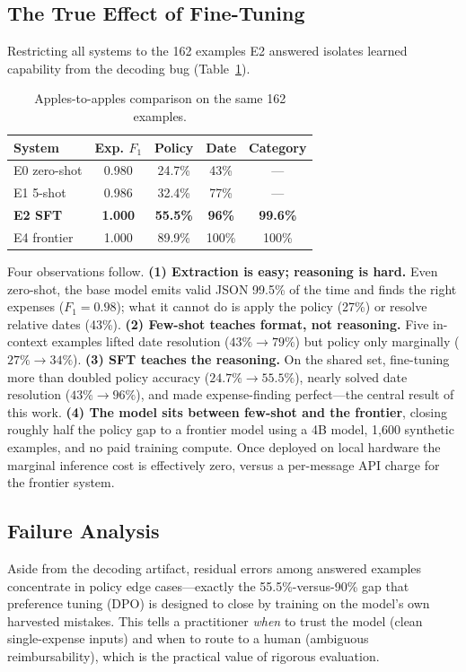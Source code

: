 \documentclass[conference]{IEEEtran}
\begin{document}
\subsection{The True Effect of Fine-Tuning}
Restricting all systems to the 162 examples E2 answered isolates learned
capability from the decoding bug (Table~\ref{tab:cond}).

\begin{table}[t]
\caption{Apples-to-apples comparison on the same 162 examples.}
\label{tab:cond}
\centering
\small
\begin{tabular}{lcccc}
\toprule
System & Exp. $F_1$ & Policy & Date & Category \\
\midrule
E0 zero-shot & 0.980 & 24.7\% & 43\% & --- \\
E1 5-shot    & 0.986 & 32.4\% & 77\% & --- \\
\textbf{E2 SFT} & \textbf{1.000} & \textbf{55.5\%} & \textbf{96\%} & \textbf{99.6\%} \\
E4 frontier  & 1.000 & 89.9\% & 100\% & 100\% \\
\bottomrule
\end{tabular}
\end{table}

Four observations follow. \textbf{(1) Extraction is easy; reasoning is hard.}
Even zero-shot, the base model emits valid JSON 99.5\% of the time and finds the
right expenses ($F_1=0.98$); what it cannot do is apply the policy (27\%) or
resolve relative dates (43\%). \textbf{(2) Few-shot teaches format, not
reasoning.} Five in-context examples lifted date resolution ($43\%\!\to\!79\%$)
but policy only marginally ($27\%\!\to\!34\%$). \textbf{(3) SFT teaches the
reasoning.} On the shared set, fine-tuning more than doubled policy accuracy
($24.7\%\!\to\!55.5\%$), nearly solved date resolution ($43\%\!\to\!96\%$), and
made expense-finding perfect---the central result of this work. \textbf{(4) The
model sits between few-shot and the frontier}, closing roughly half the policy
gap to a frontier model using a 4B model, 1{,}600 synthetic examples, and no
paid training compute. Once deployed on local hardware the marginal inference
cost is effectively zero, versus a per-message API charge for the frontier
system.

\subsection{Failure Analysis}
Aside from the decoding artifact, residual errors among answered examples
concentrate in policy edge cases---exactly the 55.5\%-versus-90\% gap that
preference tuning (DPO) is designed to close by training on the model's own
harvested mistakes. This tells a practitioner \emph{when} to trust the model
(clean single-expense inputs) and when to route to a human (ambiguous
reimbursability), which is the practical value of rigorous evaluation.
\end{document}
